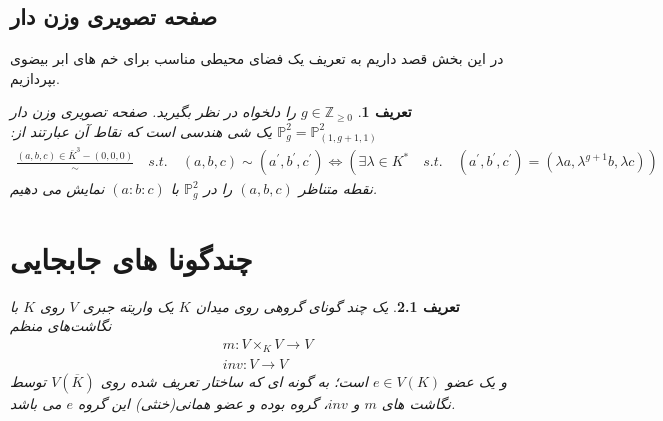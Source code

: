 \documentclass[12pt]{report}
\newtheorem{defn}[thm]{تعریف}
\begin{document}
	\section{صفحه تصویری وزن دار}
	در این بخش قصد داریم به تعریف یک فضای محیطی 
	مناسب برای خم های ابر بیضوی بپردازیم.
	\begin{defn}
		$g\in \mathbb{Z}_{\ge 0}$ 
		را دلخواه در نظر بگیرید. صفحه تصویری وزن دار 
		$\mathbb{P}^2_g = \mathbb{P}^2_{(1,g+1,1)}$
		یک شی هندسی است که نقاط آن عبارتند از:
		\begin{equation*}
			\begin{aligned}
				\frac{(a,b,c)\in \bar{K}^3-{(0,0,0)}}{\sim} \quad s.t. \quad (a,b,c)\sim (a^\prime,b^\prime,c^\prime) \Leftrightarrow (\exists \lambda \in K^* \quad s.t. \quad (a^\prime,b^\prime,c^\prime) = (\lambda a,\lambda^{g+1}b,\lambda c))
			\end{aligned}
		\end{equation*}
		نقطه متناظر
		$(a,b,c)$
		را در 
		$\mathbb{P}^2_g$
		با
		$(a:b:c)$
		نمایش می دهیم.
		
	\end{defn}
	\chapter{چندگونا های جابجایی}
	\begin{defn}
		یک چند گونای گروهی
		روی میدان 
		$K$
		یک واریته جبری 
		$V$
		روی 
		$K$
		با نگاشت‌های منظم 
		\begin{equation*}
			\begin{aligned}
				&m: V\times_{K} V \rightarrow V\\
				&inv: V\rightarrow V
			\end{aligned}
		\end{equation*}
		و یک عضو
		$e\in V(K)$
		است؛ به گونه ای که ساختار تعریف شده روی
		$V(\overline{K})$
		توسط نگاشت های
		$m$ و $inv$،
		گروه بوده و عضو همانی(خنثی) این گروه 
		$e$
		می باشد.
	\end{defn}
	
\end{document}
